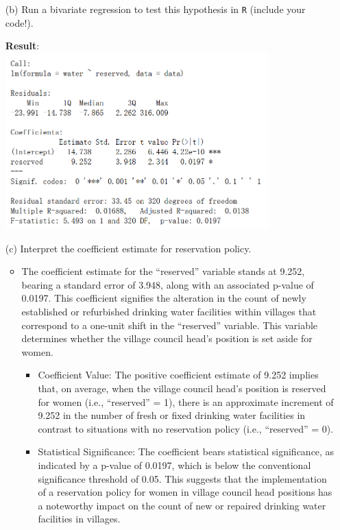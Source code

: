 \documentclass[12pt,letterpaper]{article}
\begin{document}
\begin{enumerate}
\begin{itemize}
		
	\end{itemize}
	\vspace{2cm}
	\item [(b)] Run a bivariate regression to test this hypothesis in \texttt{R} (include your code!).
	 
	\textbf{Result}:\\
   	\includegraphics[width=0.8\textwidth]{01.png}
	\vspace{6cm}
	\item [(c)] Interpret the coefficient estimate for reservation policy. 
	\begin{itemize}
		\item The coefficient estimate for the ``reserved'' variable stands at 9.252, bearing a standard error of 3.948, along with an associated p-value of 0.0197. This coefficient signifies the alteration in the count of newly established or refurbished drinking water facilities within villages that correspond to a one-unit shift in the ``reserved'' variable. This variable determines whether the village council head's position is set aside for women.
		\begin{itemize}
			\item Coefficient Value: The positive coefficient estimate of 9.252 implies that, on average, when the village council head's position is reserved for women (i.e., ``reserved'' = 1), there is an approximate increment of 9.252 in the number of fresh or fixed drinking water facilities in contrast to situations with no reservation policy (i.e., ``reserved'' = 0).
	        \item Statistical Significance: The coefficient bears statistical significance, as indicated by a p-value of 0.0197, which is below the conventional significance threshold of 0.05. This suggests that the implementation of a reservation policy for women in village council head positions has a noteworthy impact on the count of new or repaired drinking water facilities in villages.
	        
	    \end{itemize}
	\end{itemize}
\end{enumerate}
\end{document}
